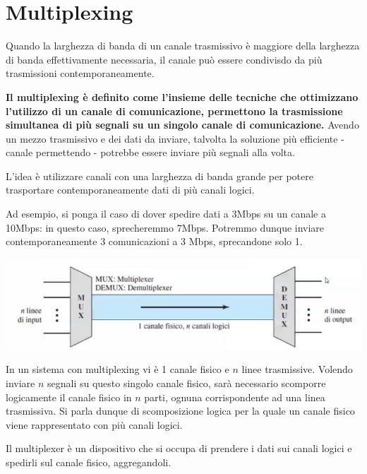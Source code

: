 \section{Multiplexing}
    
    Quando la larghezza di banda di un canale trasmissivo è maggiore della larghezza di banda effettivamente necessaria, il canale può essere condivisdo da più trasmissioni contemporaneamente.
    
    \vspace{3mm}
    
    \textbf{Il multiplexing è definito come l'insieme delle tecniche che ottimizzano l'utilizzo di un canale di comunicazione, permettono la trasmissione simultanea di più segnali su un singolo canale di comunicazione.} 
    Avendo un mezzo trasmissivo e dei dati da inviare, talvolta la soluzione più efficiente - canale permettendo - potrebbe essere inviare più segnali alla volta.
    
    L'idea è utilizzare canali con una larghezza di banda grande per potere trasportare contemporaneamente dati di più canali logici.
    
    \vspace{3mm}
    
    Ad esempio, si ponga il caso di dover spedire dati a 3Mbps su un canale a 10Mbps: in questo caso, sprecheremmo 7Mbps. Potremmo dunque inviare contemporaneamente 3 comunicazioni a 3 Mbps, sprecandone solo 1.
    
    \begin{center}
        \includegraphics[scale=0.6]{images/Multiplexing.png}
    \end{center}
    
    In un sistema con multiplexing vi è 1 canale fisico e $n$ linee trasmissive. Volendo inviare $n$ segnali su questo singolo canale fisico, sarà necessario scomporre logicamente il canale fisico in $n$ parti, ognuna corrispondente ad una linea trasmissiva. Si parla dunque di scomposizione logica per la quale un canale fisico viene rappresentato con più canali logici. 
    
    Il multiplexer è un dispositivo che si occupa di prendere i dati sui canali logici e spedirli sul canale fisico, aggregandoli. 
    
